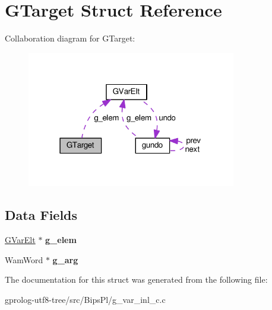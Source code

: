 \hypertarget{structGTarget}{}\section{G\+Target Struct Reference}
\label{structGTarget}


Collaboration diagram for G\+Target\+:\nopagebreak
\begin{figure}[H]
\begin{center}
\leavevmode
\includegraphics[width=259pt]{structGTarget__coll__graph}
\end{center}
\end{figure}
\subsection*{Data Fields}
\begin{DoxyCompactItemize}
\item 
\hyperlink{structGVarElt}{G\+Var\+Elt} $\ast$ {\bfseries g\+\_\+elem}\hypertarget{structGTarget_a057eea84bfa93fdfb38a7bf7d1bea531}{}\label{structGTarget_a057eea84bfa93fdfb38a7bf7d1bea531}

\item 
Wam\+Word $\ast$ {\bfseries g\+\_\+arg}\hypertarget{structGTarget_a46bf65a569e3ed1e726570e6c0f83a31}{}\label{structGTarget_a46bf65a569e3ed1e726570e6c0f83a31}

\end{DoxyCompactItemize}


The documentation for this struct was generated from the following file\+:\begin{DoxyCompactItemize}
\item 
gprolog-\/utf8-\/tree/src/\+Bips\+Pl/g\+\_\+var\+\_\+inl\+\_\+c.\+c\end{DoxyCompactItemize}
